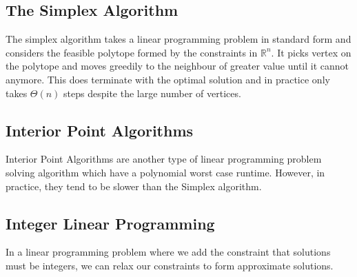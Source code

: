 \subsection{The Simplex Algorithm}

The simplex algorithm takes a linear programming problem in standard form
and considers the feasible polytope formed by the constraints in $\mathbb{R}^n$.
It picks vertex on the polytope and moves greedily to the neighbour of
greater value until it cannot anymore. This does terminate with the optimal
solution and in practice only takes $\Theta(n)$ steps despite the large
number of vertices.

\subsection{Interior Point Algorithms}

Interior Point Algorithms are another type of linear programming
problem solving algorithm which have a polynomial worst case runtime.
However, in practice, they tend to be slower than the Simplex algorithm.

\subsection{Integer Linear Programming}

In a linear programming problem where we add the constraint that solutions must be
integers, we can relax our constraints to form approximate solutions.